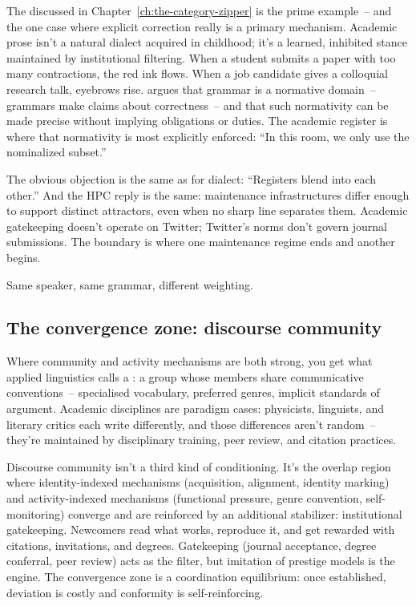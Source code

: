 The  discussed in Chapter~\ref{ch:the-category-zipper} is the prime example~-- and the one case where explicit correction really is a primary mechanism. Academic prose isn't a natural dialect acquired in childhood; it's a learned, inhibited stance maintained by institutional filtering. When a student submits a paper with too many contractions, the red ink flows. When a job candidate gives a colloquial research talk, eyebrows rise. \textcite{pullum2019-normativity} argues that grammar is a normative domain~-- grammars make claims about correctness~-- and that such normativity can be made precise without implying obligations or duties. The academic register is where that normativity is most explicitly enforced: \enquote{In this room, we only use the nominalized subset.}

The obvious objection is the same as for dialect: \enquote{Registers blend into each other.} And the HPC reply is the same: maintenance infrastructures differ enough to support distinct attractors, even when no sharp line separates them. Academic gatekeeping doesn't operate on Twitter; Twitter's norms don't govern journal submissions. The boundary is where one maintenance regime ends and another begins.

Same speaker, same grammar, different weighting.

\subsection{The convergence zone: discourse community}
\label{sec:16:community}

Where community and activity mechanisms are both strong, you get what applied linguistics calls a : a group whose members share communicative conventions~-- specialised vocabulary, preferred genres, implicit standards of argument. Academic disciplines are paradigm cases: physicists, linguists, and literary critics each write differently, and those differences aren't random~-- they're maintained by disciplinary training, peer review, and citation practices.

Discourse community isn't a third kind of conditioning. It's the overlap region where identity-indexed mechanisms (acquisition, alignment, identity marking) and activity-indexed mechanisms (functional pressure, genre convention, self-monitoring) converge and are reinforced by an additional stabilizer: institutional gatekeeping. Newcomers read what works, reproduce it, and get rewarded with citations, invitations, and degrees. Gatekeeping (journal acceptance, degree conferral, peer review) acts as the filter, but imitation of prestige models is the engine. The convergence zone is a coordination equilibrium: once established, deviation is costly and conformity is self-reinforcing.

